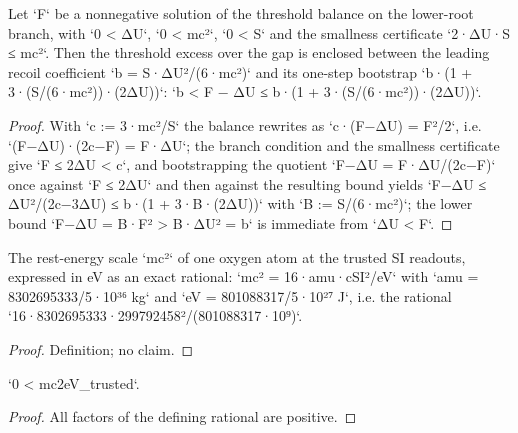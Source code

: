 \begin{theorem}
\label{thm:IPhO2026Problems_problem_IPhO_2026_1_C_2:threshold_excess_enclosure}
Let `F` be a nonnegative solution of the threshold balance on the
lower-root branch, with `0 < ΔU`, `0 < mc²`, `0 < S` and the smallness
certificate `2·ΔU·S ≤ mc²`.  Then the threshold excess over the gap is
enclosed between the leading recoil coefficient `b = S·ΔU²/(6·mc²)` and
its one-step bootstrap `b·(1 + 3·(S/(6·mc²))·(2ΔU))`:
`b < F − ΔU ≤ b·(1 + 3·(S/(6·mc²))·(2ΔU))`.
\end{theorem}
\begin{proof}
With `c := 3·mc²/S` the balance rewrites as `c·(F−ΔU) = F²/2`, i.e.
`(F−ΔU)·(2c−F) = F·ΔU`; the branch condition and the smallness certificate
give `F ≤ 2ΔU < c`, and bootstrapping the quotient
`F−ΔU = F·ΔU/(2c−F)` once against `F ≤ 2ΔU` and then against the
resulting bound yields `F−ΔU ≤ ΔU²/(2c−3ΔU) ≤ b·(1 + 3·B·(2ΔU))` with
`B := S/(6·mc²)`; the lower bound `F−ΔU = B·F² > B·ΔU² = b` is immediate
from `ΔU < F`.
\end{proof}

\begin{definition}
\label{def:IPhO2026Problems_problem_IPhO_2026_1_C_2:mc2eV_trusted}
The rest-energy scale `mc²` of one oxygen atom at the trusted SI readouts,
expressed in eV as an exact rational:
`mc² = 16·amu·cSI²/eV`
with `amu = 8302695333/5·10³⁶ kg` and `eV = 801088317/5·10²⁷ J`, i.e.
the rational `16·8302695333·299792458²/(801088317·10⁹)`.
\end{definition}
\begin{proof}
Definition; no claim.
\end{proof}

\begin{lemma}
\label{lem:IPhO2026Problems_problem_IPhO_2026_1_C_2:mc2eV_trusted_pos}
`0 < mc2eV_trusted`.
\end{lemma}
\begin{proof}
All factors of the defining rational are positive.
\end{proof}

